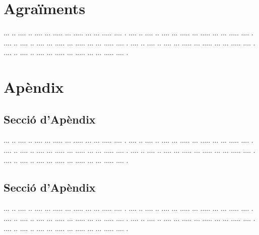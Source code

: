 \documentclass[10pt,a4paper,twocolumn,twoside]{article}
\begin{document}
\section*{Agraïments}

... ..  .... .. .... ... ..... ... ..... ... ... ..... .... .
.... ..  .... .. .... ... ..... ... ..... ... ... ..... .... .
.... ..  .... .. .... ... ..... ... ..... ... ... ..... .... .
.... ..  .... .. .... ... ..... ... ..... ... ... ..... .... .
.... ..  .... .. .... ... ..... ... ..... ... ... ..... .... .






\appendix

\section*{Apèndix}

\setcounter{section}{1}

\subsection{Secció d'Apèndix}


... ..  .... .. .... ... ..... ... ..... ... ... ..... .... .
.... ..  .... .. .... ... ..... ... ..... ... ... ..... .... .
.... ..  .... .. .... ... ..... ... ..... ... ... ..... .... .
.... ..  .... .. .... ... ..... ... ..... ... ... ..... .... .
.... ..  .... .. .... ... ..... ... ..... ... ... ..... .... .

\subsection{Secció d'Apèndix}


... ..  .... .. .... ... ..... ... ..... ... ... ..... .... .
.... ..  .... .. .... ... ..... ... ..... ... ... ..... .... .
.... ..  .... .. .... ... ..... ... ..... ... ... ..... .... .
.... ..  .... .. .... ... ..... ... ..... ... ... ..... .... .
.... ..  .... .. .... ... ..... ... ..... ... ... ..... .... .
\end{document}
